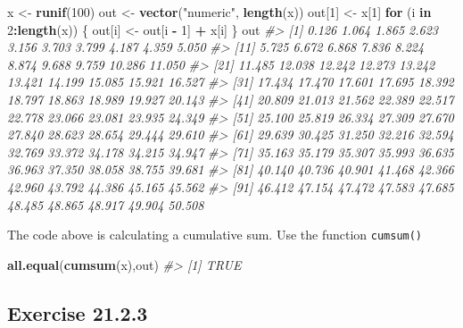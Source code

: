 \documentclass[]{book}
\newenvironment{Shaded}{\begin{snugshade}}{\end{snugshade}}
\newcommand{\CommentTok}[1]{\textcolor[rgb]{0.56,0.35,0.01}{\textit{#1}}}
\newcommand{\ControlFlowTok}[1]{\textcolor[rgb]{0.13,0.29,0.53}{\textbf{#1}}}
\newcommand{\DecValTok}[1]{\textcolor[rgb]{0.00,0.00,0.81}{#1}}
\newcommand{\KeywordTok}[1]{\textcolor[rgb]{0.13,0.29,0.53}{\textbf{#1}}}
\newcommand{\NormalTok}[1]{#1}
\newcommand{\OperatorTok}[1]{\textcolor[rgb]{0.81,0.36,0.00}{\textbf{#1}}}
\newcommand{\StringTok}[1]{\textcolor[rgb]{0.31,0.60,0.02}{#1}}
\theoremstyle{plain}
\theoremstyle{remark}
\begin{document}
\begin{Shaded}
\begin{Highlighting}[]
\NormalTok{x <-}\StringTok{ }\KeywordTok{runif}\NormalTok{(}\DecValTok{100}\NormalTok{)}
\NormalTok{out <-}\StringTok{ }\KeywordTok{vector}\NormalTok{(}\StringTok{"numeric"}\NormalTok{, }\KeywordTok{length}\NormalTok{(x))}
\NormalTok{out[}\DecValTok{1}\NormalTok{] <-}\StringTok{ }\NormalTok{x[}\DecValTok{1}\NormalTok{]}
\ControlFlowTok{for}\NormalTok{ (i }\ControlFlowTok{in} \DecValTok{2}\OperatorTok{:}\KeywordTok{length}\NormalTok{(x)) \{}
\NormalTok{  out[i] <-}\StringTok{ }\NormalTok{out[i }\OperatorTok{-}\StringTok{ }\DecValTok{1}\NormalTok{] }\OperatorTok{+}\StringTok{ }\NormalTok{x[i]}
\NormalTok{\}}
\NormalTok{out}
\CommentTok{#>   [1]  0.126  1.064  1.865  2.623  3.156  3.703  3.799  4.187  4.359  5.050}
\CommentTok{#>  [11]  5.725  6.672  6.868  7.836  8.224  8.874  9.688  9.759 10.286 11.050}
\CommentTok{#>  [21] 11.485 12.038 12.242 12.273 13.242 13.421 14.199 15.085 15.921 16.527}
\CommentTok{#>  [31] 17.434 17.470 17.601 17.695 18.392 18.797 18.863 18.989 19.927 20.143}
\CommentTok{#>  [41] 20.809 21.013 21.562 22.389 22.517 22.778 23.066 23.081 23.935 24.349}
\CommentTok{#>  [51] 25.100 25.819 26.334 27.309 27.670 27.840 28.623 28.654 29.444 29.610}
\CommentTok{#>  [61] 29.639 30.425 31.250 32.216 32.594 32.769 33.372 34.178 34.215 34.947}
\CommentTok{#>  [71] 35.163 35.179 35.307 35.993 36.635 36.963 37.350 38.058 38.755 39.681}
\CommentTok{#>  [81] 40.140 40.736 40.901 41.468 42.366 42.960 43.792 44.386 45.165 45.562}
\CommentTok{#>  [91] 46.412 47.154 47.472 47.583 47.685 48.485 48.865 48.917 49.904 50.508}
\end{Highlighting}
\end{Shaded}

The code above is calculating a cumulative sum. Use the function
\texttt{cumsum()}

\begin{Shaded}
\begin{Highlighting}[]
\KeywordTok{all.equal}\NormalTok{(}\KeywordTok{cumsum}\NormalTok{(x),out)}
\CommentTok{#> [1] TRUE}
\end{Highlighting}
\end{Shaded}

\hypertarget{exercise-21.2.3}{%
\subsection*{\texorpdfstring{Exercise
{21.2.3}}{Exercise 21.2.3}}\label{exercise-21.2.3}}
\end{document}
